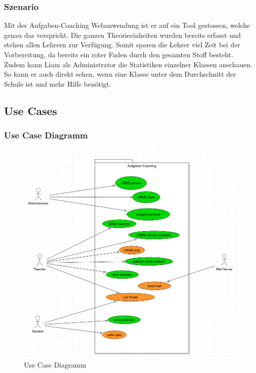 \subsubsection*{Szenario}
Mit der Aufgaben-Coaching Webanwendung ist er auf ein Tool gestossen, welche genau das verspricht. Die ganzen Theorieeinheiten wurden bereits erfasst und stehen allen Lehrern zur Verfügung. Somit sparen die Lehrer viel Zeit bei der Vorbereitung, da bereits ein roter Faden durch den gesamten Stoff besteht. \\
Zudem kann Liam als Administrator die Statistiken einzelner Klassen anschauen. So kann er auch direkt sehen, wenn eine Klasse unter dem Durchschnitt der Schule ist und mehr Hilfe benötigt.


\subsection{Use Cases}

\subsubsection{Use Case Diagramm}
\begin{minipage}{\textwidth}

\begin{figure}[H]
	\includegraphics[width=\textwidth, height=\textheight, keepaspectratio]{images/UseCaseDiagramm.png}
	\caption{Use Case Diagramm}
\end{figure}

\end{minipage}


